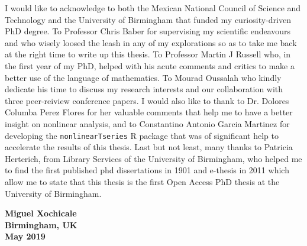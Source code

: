 
\begin{acknowledgements}      
I would like to acknowledge to both
the Mexican National Council of Science and Technology and 
the University of Birmingham 
that funded my curiosity-driven PhD degree.
To Professor Chris Baber for supervising my scientific endeavours
and who wisely loosed the leash in any of my explorations 
so as to take me back at the right time to write up this thesis.
To Professor Martin J Russell who, in the first year 
of my PhD, helped with his acute comments and critics to make a
better use of the language of mathematics.
To Mourad Oussalah who kindly dedicate his time to discuss 
my research interests and our collaboration with 
three peer-reiview conference papers.
I would also like to thank to Dr. Dolores Columba Perez Flores for
her valuable comments that help me to have a better insight on
nonlinear analysis, and to Constantino Antonio Garcia Martinez 
for developing the \texttt{nonlinearTseries} R package that was of 
significant help to accelerate the results of this thesis.
Last but not least, many thanks to Patricia Herterich, 
from Library Services of the University of Birmingham, 
who helped me to find the first published phd dissertations 
in 1901 and e-thesis in 2011 which allow me to 
state that this thesis is the first Open Access
PhD thesis at the University of Birmingham.

\begin{flushright}
\textbf{Miguel Xochicale}\\
\textbf{Birmingham, UK}\\
\textbf{May 2019}
\end{flushright}

\end{acknowledgements}
